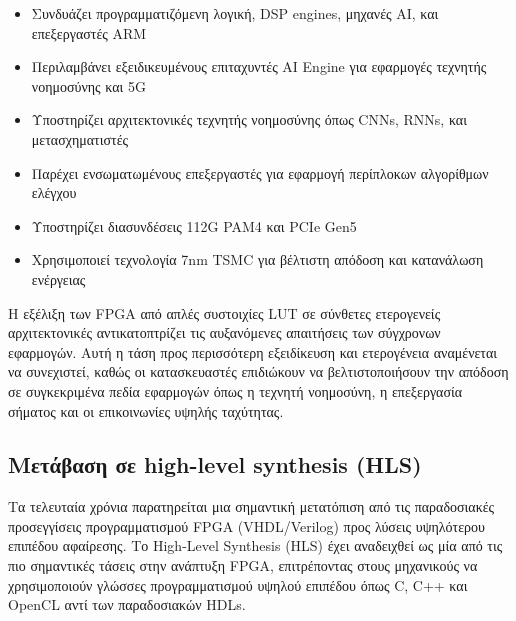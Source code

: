 \begin{itemize}
  \item Συνδυάζει προγραμματιζόμενη λογική, DSP engines, μηχανές AI, και επεξεργαστές ARM
  \item Περιλαμβάνει εξειδικευμένους επιταχυντές AI Engine για εφαρμογές τεχνητής νοημοσύνης και 5G
  \item Υποστηρίζει αρχιτεκτονικές τεχνητής νοημοσύνης όπως CNNs, RNNs, και μετασχηματιστές
  \item Παρέχει ενσωματωμένους επεξεργαστές για εφαρμογή περίπλοκων αλγορίθμων ελέγχου
  \item Υποστηρίζει διασυνδέσεις 112G PAM4 και PCIe Gen5
  \item Χρησιμοποιεί τεχνολογία 7nm TSMC για βέλτιστη απόδοση και κατανάλωση ενέργειας
\end{itemize}

Η εξέλιξη των FPGA από απλές συστοιχίες LUT σε σύνθετες ετερογενείς αρχιτεκτονικές αντικατοπτρίζει τις αυξανόμενες απαιτήσεις των σύγχρονων εφαρμογών. Αυτή η τάση προς περισσότερη εξειδίκευση και ετερογένεια αναμένεται να συνεχιστεί, καθώς οι κατασκευαστές επιδιώκουν να βελτιστοποιήσουν την απόδοση σε συγκεκριμένα πεδία εφαρμογών όπως η τεχνητή νοημοσύνη, η επεξεργασία σήματος και οι επικοινωνίες υψηλής ταχύτητας.

\subsection{Μετάβαση σε high-level synthesis (HLS)}

Τα τελευταία χρόνια παρατηρείται μια σημαντική μετατόπιση από τις παραδοσιακές προσεγγίσεις προγραμματισμού FPGA (VHDL/Verilog) προς λύσεις υψηλότερου επιπέδου αφαίρεσης.
Το High-Level Synthesis (HLS) έχει αναδειχθεί ως μία από τις πιο σημαντικές τάσεις στην ανάπτυξη FPGA, επιτρέποντας στους μηχανικούς να χρησιμοποιούν γλώσσες προγραμματισμού υψηλού επιπέδου όπως C, C++ και OpenCL αντί των παραδοσιακών HDLs.

